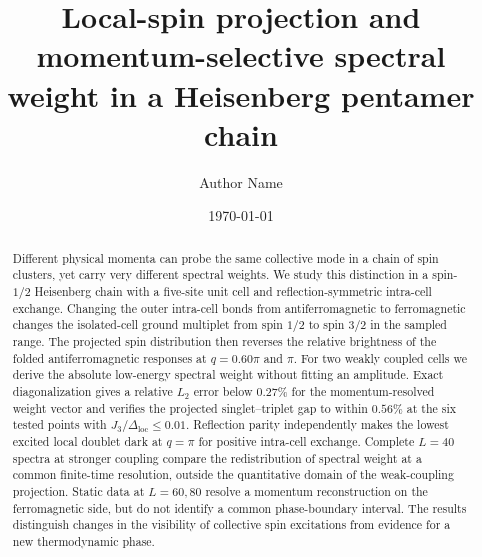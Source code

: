 \documentclass[
  aps,
  prb,
  reprint,
  amsmath,
  amssymb,
  superscriptaddress,
  longbibliography,
  nofootinbib,
  floatfix
]{revtex4-2}
\begin{document}
\raggedbottom

\title{Local-spin projection and momentum-selective spectral weight
in a Heisenberg pentamer chain}

\author{Author Name}

\date{\today}

\begin{abstract}
Different physical momenta can probe the same collective mode in a chain of
spin clusters, yet carry very different spectral weights.
We study this distinction in a spin-$1/2$ Heisenberg chain with a five-site unit
cell and reflection-symmetric intra-cell exchange.
Changing the outer intra-cell bonds from antiferromagnetic to ferromagnetic
changes the isolated-cell ground multiplet from spin $1/2$ to spin $3/2$ in
the sampled range. The projected spin distribution then reverses the relative
brightness of the folded antiferromagnetic responses at $q=0.60\pi$ and $\pi$.
For two weakly coupled cells we derive the absolute low-energy spectral weight
without fitting an amplitude. Exact diagonalization gives a relative $L_2$
error below $0.27\%$ for the momentum-resolved weight vector and verifies
the projected singlet--triplet gap to within
$0.56\%$ at the six tested points with
$J_3/\Delta_{\mathrm{loc}}\le0.01$.
Reflection parity independently makes the lowest excited local doublet dark
at $q=\pi$ for positive intra-cell exchange.
Complete $L=40$ spectra at stronger coupling compare the redistribution
of spectral weight at a common finite-time resolution, outside the quantitative
domain of the weak-coupling projection.
Static data at $L=60,80$ resolve a momentum reconstruction on the ferromagnetic
side, but do not identify a common phase-boundary interval.
The results distinguish changes in the visibility of collective spin
excitations from evidence for a new thermodynamic phase.
\end{abstract}

\maketitle







\begin{acknowledgments}
\end{acknowledgments}
\end{document}
